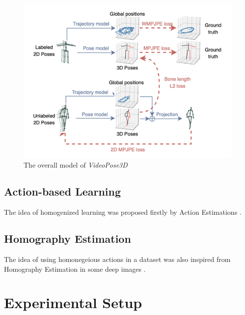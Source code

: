 \documentclass[10pt,twocolumn,letterpaper]{article}
\begin{document}
\begin{figure}[H]
	\begin{center}
  		\includegraphics[width=0.9\linewidth]{original.png}
	\end{center}
   	\caption{The overall model of \textit{VideoPose3D}}
	\label{fig:long}
	\label{fig:onecol}
\end{figure}

\subsection{Action-based Learning}

The idea of homogenized learning was proposed firstly by Action Estimations \cite{yao2012coupled,wang2013action}.



\subsection{Homography Estimation}

The idea of using homonegeious actions in a dataset was also inspired from Homography Estimation
in some deep images \cite{detone2016deep}. 



\section{Experimental Setup}
\end{document}
